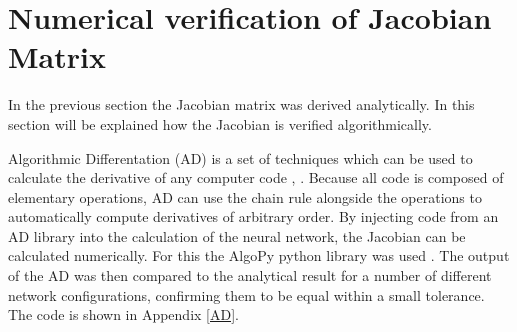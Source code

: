\section{Numerical verification of Jacobian Matrix}
In the previous section the Jacobian matrix was derived analytically. In this section will be explained how the Jacobian is verified algorithmically.

Algorithmic Differentation (AD) is a set of techniques which can be used to calculate the derivative of any computer code \cite{Rall1981}, \cite{wikiad}. Because all code is composed of elementary operations, AD can use the chain rule alongside the operations to automatically compute derivatives of arbitrary order. By injecting code from an AD library into the calculation of the neural network, the Jacobian can be calculated numerically. For this the AlgoPy python library was used \cite{algopy}. The output of the AD was then compared to the analytical result for a number of different network configurations, confirming them to be equal within a small tolerance. The code is shown in Appendix \ref{AD}.

